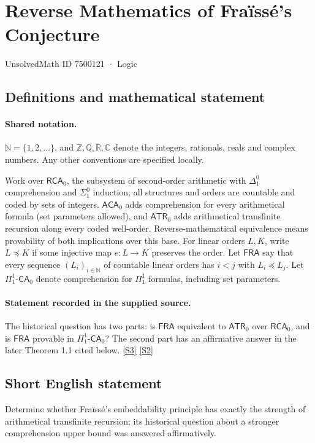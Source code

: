 \documentclass[11pt]{article}
\newcommand{\sref}[2]{\hyperlink{source:#1:#2}{[S#2]}}
\begin{document}
\setcounter{section}{7500120}
\section{Reverse Mathematics of Fraïssé's Conjecture}\label{7500121}
{\small\sffamily UnsolvedMath ID 7500121 · Logic}
\subsection{Definitions and mathematical statement}

\paragraph{Shared notation.}$\mathbb N=\{1,2,\ldots\}$, and $\mathbb Z,\mathbb Q,\mathbb R,\mathbb C$ denote the integers, rationals, reals and complex numbers. Any other conventions are specified locally.


Work over $\mathsf{RCA}_0$, the subsystem of second-order arithmetic with $\Delta^0_1$ comprehension and $\Sigma^0_1$ induction; all structures and orders are countable and coded by sets of integers. $\mathsf{ACA}_0$ adds comprehension for every arithmetical formula (set parameters allowed), and $\mathsf{ATR}_0$ adds arithmetical transfinite recursion along every coded well-order. Reverse-mathematical equivalence means provability of both implications over this base. For linear orders $L,K$, write $L\preccurlyeq K$ if some injective map $e:L\to K$ preserves the order. Let $\mathsf{FRA}$ say that every sequence $(L_i)_{i\in\mathbb N}$ of countable linear orders has $i<j$ with $L_i\preccurlyeq L_j$. Let $\Pi^1_1$-$\mathsf{CA}_0$ denote comprehension for $\Pi^1_1$ formulas, including set parameters.
\paragraph{Statement recorded in the supplied source.}
The historical question has two parts: is $\mathsf{FRA}$ equivalent to $\mathsf{ATR}_0$ over $\mathsf{RCA}_0$, and is $\mathsf{FRA}$ provable in $\Pi^1_1$-$\mathsf{CA}_0$? The second part has an affirmative answer in the later Theorem 1.1 cited below. \sref{7500121}{3} \sref{7500121}{2}
\subsection{Short English statement}
Determine whether Fraïssé's embeddability principle has exactly the strength of arithmetical transfinite recursion; its historical question about a stronger comprehension upper bound was answered affirmatively.
\end{document}
